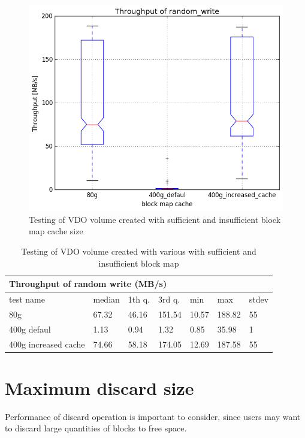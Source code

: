 \documentclass[
  color, %
  table, %
  lof,   %
  lot,   %
]{fithesis3}
\begin{document}
\begin{figure}
        \centering
        \includegraphics[width=\textwidth]{../results/block_map_cache/report/random_write1_compare_boxplots}
\caption[Block map cache size testing]{Testing of VDO volume created with sufficient and insufficient block map cache size}
\label{fig:blockmap-boxplots}
\end{figure}

\begin{table}
\centering
\begin{tabular}{|l|l|l|l|l|l|l|}
        \hline
        \multicolumn{7}{|l|}{Throughput of random write (MB/s)} \\ \hline
        test name & median & 1th q. & 3rd q. & min & max & stdev \\ \hline 
80g & 67.32 & 46.16 & 151.54 & 10.57 & 188.82 & 55 \\ \hline
400g defaul & 1.13 & 0.94 & 1.32 & 0.85 & 35.98 & 1 \\ \hline
400g increased cache & 74.66 & 58.18 & 174.05 & 12.69 & 187.58 & 55 \\ \hline
\end{tabular}
\caption{Testing of VDO volume created with various with sufficient and insufficient block map}
\label{tab:blockmap-tab}
\end{table}



\section{Maximum discard size}
Performance of discard operation is important to consider, since users may want to discard large quantities of blocks to free space.
\end{document}
